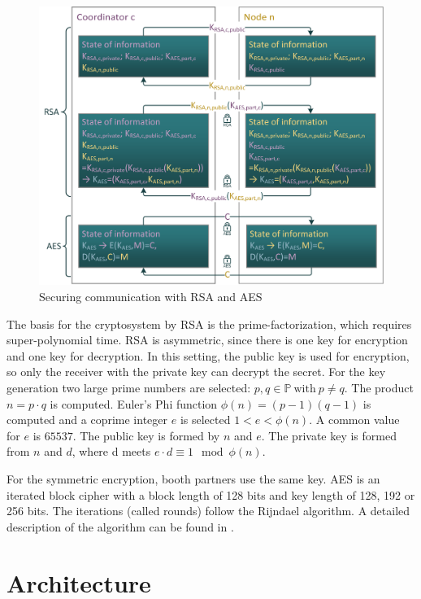 \begin{figure}[!htbp] %
	\caption{Securing communication with \gls{RSA} and \gls{AES}} \label{figure:RSA/AES scheme}
	\includegraphics[scale=1.0]{figures/encryption-ion.png}
\end{figure}

The basis for the cryptosystem by \gls{RSA} is the prime-factorization, which requires super-polynomial time. \gls{RSA} is asymmetric, since there is one key for encryption and one key for decryption. In this setting, the public key is used for encryption, so only the receiver with the private key can decrypt the secret.
For the key generation two large prime numbers are selected: $p,q \in \mathbb{P} \ \text{with} \ p\neq q$. The product $n=p\cdot q$ is computed. Euler's Phi function $\phi (n)=(p-1)(q-1)$ is computed and a coprime integer $e$ is selected $1<e<\phi(n)$. A common value for $e$ is $65537$. The public key is formed by $n$ and $e$.
The private key is formed from $n$ and $d$, where d meets $e\cdot d\equiv 1\mod \phi(n)$.

For the symmetric encryption, booth partners use the same key. \gls{AES} is an iterated block cipher with a block length of 128 bits and key length of 128, 192 or 256 bits. The iterations (called rounds) follow the Rijndael algorithm. A detailed description of the algorithm can be found in \textcite[pp. 20-25]{Delfs2015}.

\FloatBarrier

\section{Architecture} \label{Architecture}

